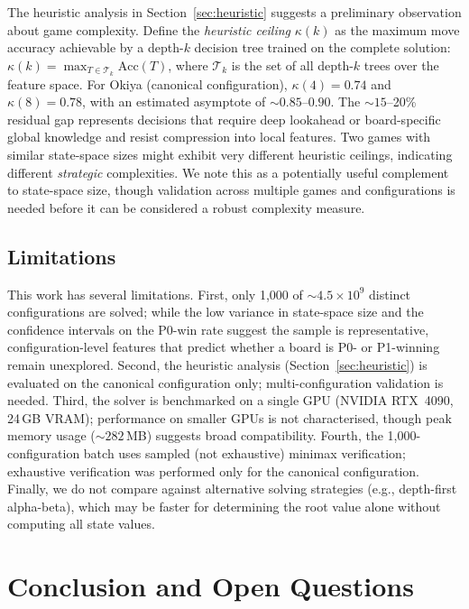 \documentclass[11pt,a4paper]{article}
\begin{document}
The heuristic analysis in Section~\ref{sec:heuristic} suggests a
preliminary observation about game complexity.  Define the
\emph{heuristic ceiling} $\kappa(k)$ as the maximum move accuracy
achievable by a depth-$k$ decision tree trained on the complete
solution: $\kappa(k) = \max_{T \in \mathcal{T}_k} \mathrm{Acc}(T)$,
where $\mathcal{T}_k$ is the set of all depth-$k$ trees over the
feature space.  For Okiya (canonical configuration), $\kappa(4) = 0.74$
and $\kappa(8) = 0.78$, with an estimated asymptote of
${\sim}0.85$--$0.90$.  The ${\sim}15$--20\% residual gap represents
decisions that require deep lookahead or board-specific global knowledge
and resist compression into local features.  Two games with similar
state-space sizes might exhibit very different heuristic ceilings,
indicating different \emph{strategic} complexities.  We note this as a
potentially useful complement to state-space size, though validation
across multiple games and configurations is needed before it can be
considered a robust complexity measure.

\subsection{Limitations}

This work has several limitations.  First, only 1{,}000 of
${\sim}4.5 \times 10^{9}$ distinct configurations are solved; while the
low variance in state-space size and the confidence intervals on the
P0-win rate suggest the sample is representative, configuration-level
features that predict whether a board is P0- or P1-winning remain
unexplored.  Second, the heuristic analysis
(Section~\ref{sec:heuristic}) is evaluated on the canonical
configuration only; multi-configuration validation is needed.  Third, the
solver is benchmarked on a single GPU (NVIDIA RTX~4090, 24\,GB VRAM);
performance on smaller GPUs is not characterised, though peak memory
usage (${\sim}282$\,MB) suggests broad compatibility.  Fourth, the
1{,}000-configuration batch uses sampled (not exhaustive) minimax
verification; exhaustive verification was performed only for the
canonical configuration.  Finally, we do not compare against
alternative solving strategies (e.g., depth-first alpha-beta), which
may be faster for determining the root value alone without computing
all state values.

\section{Conclusion and Open Questions}\label{sec:open}
\end{document}
